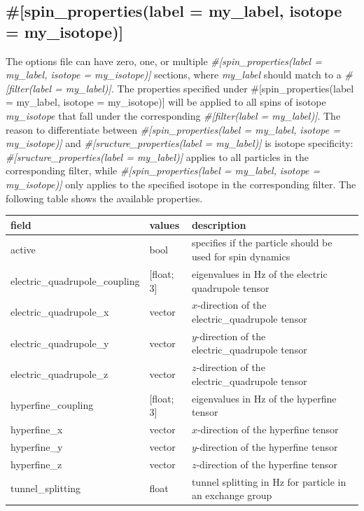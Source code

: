 \documentclass{book}
\begin{document}
\subsection{\#[spin\_properties(label = my\_label, isotope = my\_isotope)]}
The options file can have zero, one, or multiple 
\textit{\#[spin\_properties(label = my\_label, isotope = my\_isotope)]} 
sections, where \textit{my\_label} should match to a 
\textit{\#[filter(label = my\_label)]}.
The properties specified under  
{\#[spin\_properties(label = my\_label, isotope = my\_isotope)]} will be applied
to all spins of isotope \textit{my\_isotope} that fall under the corresponding
\textit{\#[filter(label = my\_label)]}.
The reason to differentiate between 
\textit{\#[spin\_properties(label = my\_label, }
\textit{isotope = my\_isotope)]}
and \textit{\#[sructure\_properties(label = my\_label)]}
is isotope specificity:
\textit{\#[sructure\_properties(label = my\_label)]} applies to all
particles in the corresponding filter, while 
\textit{\#[spin\_properties(label = my\_label, }
\textit{isotope = my\_isotope)]}
only applies to the specified isotope in the corresponding filter.
The following table shows the available properties.
\begin{center}
\begin{tabular}{| m{20em} | m{1.5cm}| m{7cm} |}
 \hline 
 \textbf{field} & \textbf{values} & \textbf{description} \\ 
 \hline 
 active & bool & 
 specifies if the particle should be used for spin dynamics\\
 \hline 
 electric\_quadrupole\_coupling & [float; 3] & 
 eigenvalues in Hz of the electric quadrupole tensor\\
 \hline 
 electric\_quadrupole\_x & 
 vector & $x$-direction of the electric\_quadrupole tensor\\
 \hline 
 electric\_quadrupole\_y & 
 vector & $y$-direction of the electric\_quadrupole tensor\\
 \hline 
 electric\_quadrupole\_z & 
 vector & $z$-direction of the electric\_quadrupole tensor\\
 \hline 
 hyperfine\_coupling & [float; 3] & eigenvalues in Hz of the hyperfine tensor\\
 \hline 
 hyperfine\_x & vector & $x$-direction of the hyperfine tensor\\
 \hline 
 hyperfine\_y & vector & $y$-direction of the hyperfine tensor\\
 \hline 
 hyperfine\_z & vector & $z$-direction of the hyperfine tensor\\
 \hline 
 tunnel\_splitting & float & 
 tunnel splitting in Hz for particle in an exchange group \\
 \hline 
\end{tabular}
\end{center} 
\end{document}
